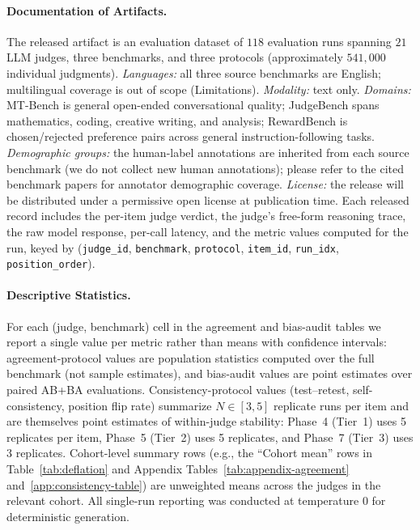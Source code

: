 \paragraph{Documentation of Artifacts.}
The released artifact is an evaluation dataset of $118$ evaluation
runs spanning $21$ LLM judges, three benchmarks, and three protocols
(approximately $541{,}000$ individual judgments). \textit{Languages:}
all three source benchmarks are English; multilingual coverage is out
of scope (Limitations). \textit{Modality:} text only.
\textit{Domains:} MT-Bench is general open-ended conversational
quality; JudgeBench spans mathematics, coding, creative writing, and
analysis; RewardBench is chosen/rejected preference pairs across
general instruction-following tasks. \textit{Demographic groups:} the
human-label annotations are inherited from each source benchmark (we
do not collect new human annotations); please refer to the cited
benchmark papers for annotator demographic coverage.
\textit{License:} the release will be distributed under a permissive
open license at publication time. Each released record includes the
per-item judge verdict, the judge's free-form reasoning trace, the
raw model response, per-call latency, and the metric values computed
for the run, keyed by (\texttt{judge\_id}, \texttt{benchmark},
\texttt{protocol}, \texttt{item\_id}, \texttt{run\_idx},
\texttt{position\_order}).

\paragraph{Descriptive Statistics.}
For each (judge, benchmark) cell in the agreement and bias-audit
tables we report a single value per metric rather than means with
confidence intervals: agreement-protocol values are population
statistics computed over the full benchmark (not sample estimates),
and bias-audit values are point estimates over paired AB+BA
evaluations. Consistency-protocol values (test--retest,
self-consistency, position flip rate) summarize $N \in [3, 5]$
replicate runs per item and are themselves point estimates of
within-judge stability: Phase~4 (Tier~1) uses 5 replicates per
item, Phase~5 (Tier~2) uses 5 replicates, and Phase~7 (Tier~3) uses 3
replicates. Cohort-level summary rows (e.g., the ``Cohort mean'' rows
in Table~\ref{tab:deflation} and Appendix
Tables~\ref{tab:appendix-agreement} and~\ref{app:consistency-table})
are unweighted means across the judges in the relevant cohort. All
single-run reporting was conducted at temperature $0$ for
deterministic generation.

